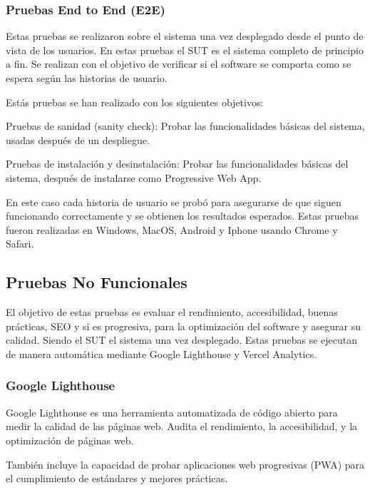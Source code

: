 \documentclass[12pt,twoside,titlepage]{report}
\begin{document}
\subsubsection{Pruebas End to End (E2E)}

Estas pruebas se realizaron sobre el sistema una vez desplegado desde el punto de vista de los usuarios. En estas pruebas el SUT es el sistema completo de principio a fin. Se realizan con el objetivo de verificar si el software se comporta como se espera según las historias de usuario.

Estás pruebas se han realizado con los siguientes objetivos:

\begin{compactitem}
    \item Pruebas de sanidad (sanity check): Probar las funcionalidades básicas del sistema, usadas después de un despliegue.
    \item Pruebas de instalación y desinstalación: Probar las funcionalidades básicas del sistema, después de instalarse como Progressive Web App.
\end{compactitem}

En este caso cada historia de usuario se probó para asegurarse de que siguen funcionando correctamente y se obtienen los resultados esperados. Estas pruebas fueron realizadas en Windows, MacOS, Android y Iphone usando Chrome y Safari.

\subsection{Pruebas No Funcionales}

El objetivo de estas pruebas es evaluar el rendimiento, accesibilidad, buenas prácticas, SEO y si es progresiva, para la optimización del software y asegurar su calidad. Siendo el SUT el sistema una vez desplegado. Estas pruebas se ejecutan de manera automática mediante Google Lighthouse y Vercel Analytics.

\subsubsection{Google Lighthouse}

Google Lighthouse es una herramienta automatizada de código abierto para medir la calidad de las páginas web. Audita el rendimiento, la accesibilidad, y la optimización de páginas web.

También incluye la capacidad de probar aplicaciones web progresivas (PWA) para el cumplimiento de estándares y mejores prácticas.
\end{document}
